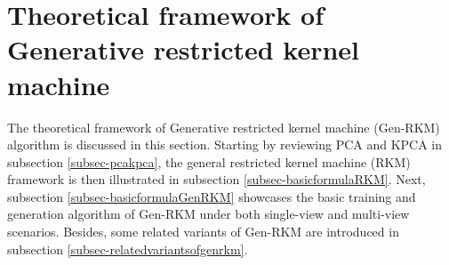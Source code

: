 \section{Theoretical framework of Generative restricted kernel machine}
\label{sec-tfgenrkm}
The theoretical framework of Generative restricted kernel machine (Gen-RKM) algorithm is discussed in this section. Starting by reviewing PCA and KPCA in subsection \ref{subsec-pcakpca}, the general restricted kernel machine (RKM) framework is then illustrated in subsection \ref{subsec-basicformulaRKM}. Next, subsection \ref{subsec-basicformulaGenRKM} showcases the basic training and generation algorithm of Gen-RKM under both single-view and multi-view scenarios. Besides, some related variants of Gen-RKM are introduced in subsection \ref{subsec-relatedvariantsofgenrkm}.

